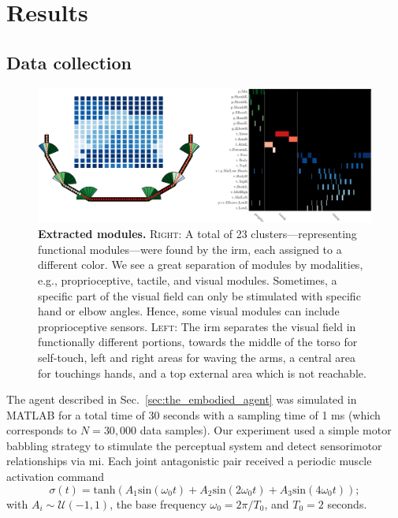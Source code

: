 \section{Results}

\subsection{Data collection}
\begin{figure}[t!]
    \centering
    \includegraphics[height=.35\textwidth]{fig/modules_total.png}
    \caption{\textbf{Extracted modules.} \textsc{Right}: A total of 23 clusters---representing functional modules---were found by the \ac{irm}, each assigned to a different color. We see a great separation of modules by modalities, e.g., proprioceptive, tactile, and visual modules. Sometimes, a specific part of the visual field can only be stimulated with specific hand or elbow angles. Hence, some visual modules can include proprioceptive sensors. \textsc{Left}: The \ac{irm} separates the visual field in functionally different portions, towards the middle of the torso for self-touch, left and right areas for waving the arms, a central area for touchings hands, and a top external area which is not reachable.}
    \label{fig:irm_modules}
\end{figure}

The agent described in Sec.~\ref{sec:the_embodied_agent} was simulated in MATLAB for a total time of 30 seconds with a sampling time of 1 ms (which corresponds to $N = 30,000$ data samples). Our experiment used a simple motor babbling strategy to stimulate the perceptual system and detect sensorimotor relationships via \ac{mi}. Each joint antagonistic pair received a periodic muscle activation command
\begin{equation}\label{eq:motor_babbling_torques}
	\sigma(t) =  \text{tanh} \left( A_1 \text{sin}\left(\omega_0 t\right) + A_2 \text{sin}\left(2\omega_0 t\right) + A_3 \text{sin}\left(4\omega_0 t\right) \right);
\end{equation}	
with $A_i \sim \mathcal{U}(-1,1)$, the base frequency $\omega_0 = 2\pi/T_0$, and $T_0=2$ seconds.

